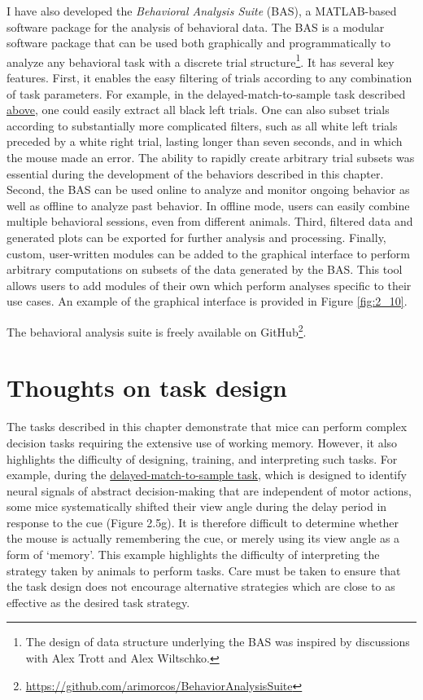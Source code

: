 I have also developed the \textit{Behavioral Analysis Suite} (BAS), a MATLAB-based software package for the analysis of behavioral data. The BAS is a modular software package that can be used both graphically and programmatically to analyze any behavioral task with a discrete trial structure\footnote{\noindent The design of data structure underlying the BAS was inspired by discussions with Alex Trott and Alex Wiltschko.}. It has several key features. First, it enables the easy filtering of trials according to any combination of task parameters. For example, in the delayed-match-to-sample task described \hyperref[sec:dms]{above}, one could easily extract all black left trials. One can also subset trials according to substantially more complicated filters, such as all white left trials preceded by a white right trial, lasting longer than seven seconds, and in which the mouse made an error. The ability to rapidly create arbitrary trial subsets was essential during the development of the behaviors described in this chapter. Second, the BAS can be used online to analyze and monitor ongoing behavior as well as offline to analyze past behavior. In offline mode, users can easily combine multiple behavioral sessions, even from different animals. Third, filtered data and generated plots can be exported for further analysis and processing. Finally, custom, user-written modules can be added to the graphical interface to perform arbitrary computations on subsets of the data generated by the BAS. This tool allows users to add modules of their own which perform analyses specific to their use cases. An example of the graphical interface is provided in Figure \ref{fig:2_10}.

\bigskip
The behavioral analysis suite is freely available on GitHub\footnote{\url{https://github.com/arimorcos/BehaviorAnalysisSuite}}.

\section{Thoughts on task design} \label{sec:thoughts_task}

The tasks described in this chapter demonstrate that mice can perform complex decision tasks requiring the extensive use of working memory. However, it also highlights the difficulty of designing, training, and interpreting such tasks. For example, during the \hyperref[sec:dms]{delayed-match-to-sample task}, which is designed to identify neural signals of abstract decision-making that are independent of motor actions, some mice systematically shifted their view angle during the delay period in response to the cue (Figure 2.5g). It is therefore difficult to determine whether the mouse is actually remembering the cue, or merely using its view angle as a form of ‘memory’. This example highlights the difficulty of interpreting the strategy taken by animals to perform tasks. Care must be taken to ensure that the task design does not encourage alternative strategies which are close to as effective as the desired task strategy.


